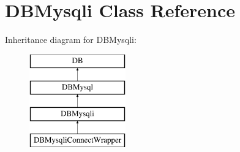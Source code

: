 \hypertarget{classDBMysqli}{\section{D\+B\+Mysqli Class Reference}
\label{classDBMysqli}
}
Inheritance diagram for D\+B\+Mysqli\+:\begin{figure}[H]
\begin{center}
\leavevmode
\includegraphics[height=4.000000cm]{classDBMysqli}
\end{center}
\end{figure}
